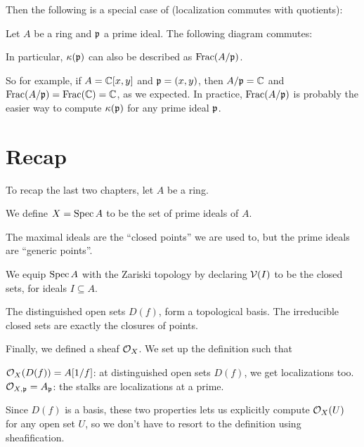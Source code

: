Then the following is a special case of
(localization commutes with quotients):
\begin{theorem}
	Let $A$ be a ring and $\mathfrak p$ a prime ideal.
	The following diagram commutes:
	\begin{center}
	\end{center}
	In particular, $\kappa(\mathfrak p)$
	can also be described as $\operatorname{Frac}(A/\mathfrak p)$.
\end{theorem}
So for example, if $A = \mathbb C[x,y]$ and $\mathfrak p = (x,y)$,
then $A/\mathfrak p = \mathbb C$ and $\operatorname{Frac}(A/\mathfrak p) = \operatorname{Frac}(\mathbb C) = \mathbb C$, as we expected.
In practice, $\operatorname{Frac}(A/\mathfrak p)$ is probably the easier way
to compute $\kappa(\mathfrak p)$ for any prime ideal $\mathfrak p$.



\section{Recap}
To recap the last two chapters, let $A$ be a ring.
\begin{itemize}
	\ii We define $X = \operatorname{Spec} A$ to be the set of prime ideals of $A$.
	\begin{itemize}
		\ii The maximal ideals are the ``closed points'' we are used to,
		but the prime ideals are ``generic points''.
	\end{itemize}

	\ii We equip $\operatorname{Spec} A$ with the Zariski topology by declaring
	$\mathcal V(I)$ to be the closed sets, for ideals $I \subseteq A$.
	\begin{itemize}
		\ii The distinguished open sets $D(f)$,
		form a topological basis.
		\ii The irreducible closed sets are exactly the closures of points.
	\end{itemize}

	\ii Finally, we defined a sheaf $\mathcal O_X$.
	We set up the definition such that
	\begin{itemize}
		\ii $\mathcal O_{X}(D(f)) = A[1/f]$:
		at distinguished open sets $D(f)$,
		we get localizations too.
		\ii $\mathcal O_{X,\mathfrak p} = A_\mathfrak p$:
		the stalks are localizations at a prime.
	\end{itemize}
	Since $D(f)$ is a basis,
	these two properties lets us explicitly compute $\mathcal O_X(U)$
	for any open set $U$,
	so we don't have to resort to the definition using sheafification.
\end{itemize}


